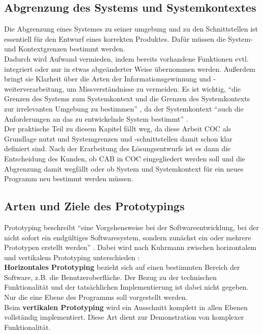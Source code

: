 \documentclass [12pt, a4paper, oneside, titlepage, ngerman]{article}
\begin{document}
\subsection{Abgrenzung des Systems und Systemkontextes}
Die Abgrenzung eines Systemes zu seiner umgebung und zu den Schnittstellen ist essentiell für den Entwurf eines korrekten Produktes. Dafür müssen die System- und Kontextgrenzen bestimmt werden. \\
Dadurch wird Aufwand vermieden, indem bereits vorhandene Funktionen evtl. integriert oder nur in etwas abgeänderter Weise übernommen werden. Außerdem bringt sie Klarheit über die Arten der Informationsgewinnung und -weiterverarbeitung, um Missverständnisse zu vermeiden. Es ist wichtig, "`die Grenzen des Systems zum Systemkontext und die Grenzen des Systemkontexts zur irrelevanten Umgebung zu bestimmen"' \cite[S.20]{PohlRupp2015}, da der Systemkontext "`auch die Anforderungen an das zu entwickelnde System bestimmt"' \cite[S.20]{PohlRupp2015}. \\
Der praktische Teil zu diesem Kapitel fällt weg, da diese Arbeit \ac{COC} als Grundlage nutzt und Systemgrenzen und -schnittstellen damit schon klar definiert sind. Nach der Erarbeitung des Lösungsentwurfs ist es dann die Entscheidung des Kunden, ob \ac{CAB} in \ac{COC} eingegliedert werden soll und die Abgrenzung damit wegfällt oder ob System und Systemkontext für ein neues Programm neu bestimmt werden müssen.

\subsection{Arten und Ziele des Prototypings}
Prototyping beschreibt "`eine Vorgehensweise bei der Softwareentwicklung, bei der nicht sofort ein endgültiges Softwaresystem, sondern zunächst ein oder mehrere Prototypen erstellt werden"' \cite[S.152]{gabler}. Dabei wird nach Kuhrmann zwischen horizontalem und vertikalem Prototyping unterschieden \cite[vgl.][]{Kuhrmann2012}: \\ 
\textbf{Horizontales Prototyping} bezieht sich auf einen bestimmten Bereich der Software, z.B. die Benutzeroberfläche. Der Bezug zu der technischen Funktionalität und der tatsächlichen Implementierung ist dabei nicht gegeben. Nur die eine Ebene des Programms soll vorgestellt werden.\\
Beim \textbf{vertikalen Prototyping} wird ein Ausschnitt komplett in allen Ebenen vollständig implementiert. Diese Art dient zur Demonstration von komplexer Funktionalität.\\
\end{document}
